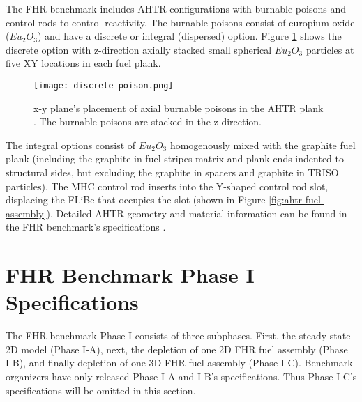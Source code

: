 The \gls{FHR} benchmark includes \gls{AHTR} configurations with burnable poisons 
and control rods to control reactivity. 
The burnable poisons consist of europium oxide ($Eu_2O_3$) and have a discrete
or integral (dispersed) option. 
Figure \ref{fig:discrete-poison} shows the discrete option with z-direction axially 
stacked small spherical $Eu_2O_3$ particles at five XY locations in each 
fuel plank. 
\begin{figure}[htbp]
    \centering
    \texttt{[image: discrete-poison.png]}
    \caption{x-y plane's placement of axial burnable poisons in the \acrlong{AHTR} 
    plank \cite{petrovic_benchmark_2021}. The burnable poisons are stacked in 
    the z-direction.}
    \label{fig:discrete-poison}
\end{figure}
The integral options consist of $Eu_2O_3$ homogenously mixed with the graphite 
fuel plank (including the graphite in fuel stripes matrix and plank ends 
indented to structural sides, but excluding the graphite in spacers and 
graphite in TRISO particles).
The \gls{MHC} control rod inserts into the Y-shaped control rod slot, displacing
the \gls{FLiBe} that occupies the slot 
(shown in Figure \ref{fig:ahtr-fuel-assembly}). 
Detailed \gls{AHTR} geometry and material information can be found in the 
\gls{FHR} benchmark's specifications \cite{petrovic_benchmark_2021}.

\section{FHR Benchmark Phase I Specifications}
\label{sec:phase1}
The \gls{FHR} benchmark Phase I consists of three subphases.
First, the steady-state 2D model (Phase I-A), next, the depletion of one 2D \gls{FHR} fuel 
assembly (Phase I-B), and finally depletion of one 3D \gls{FHR} fuel assembly 
(Phase I-C).
Benchmark organizers have only released Phase I-A and I-B's specifications. 
Thus Phase I-C's specifications will be omitted in this section.

